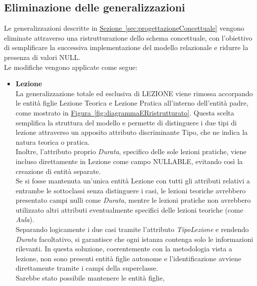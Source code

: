 \documentclass[10pt,twoside]{article}
\begin{document}
{    \subsection{Eliminazione delle generalizzazioni}{
        Le generalizzazioni descritte in \hyperref[sec:progettazioneConcettuale]{Sezione~\ref*{sec:progettazioneConcettuale}} vengono 
        eliminate attraverso una ristrutturazione dello schema concettuale, 
        con l’obiettivo di semplificare la successiva implementazione del modello relazionale 
        e ridurre la presenza di valori NULL. \\
        Le modifiche vengono applicate come segue:
        \begin{itemize}
            \item \textbf{Lezione} \\ La generalizzazione totale ed esclusiva di LEZIONE viene rimossa 
            accorpando le entità figlie Lezione Teorica e Lezione Pratica all'interno dell'entità 
            padre, come mostrato in \hyperref[fig:diagrammaERristrutturato]{Figura~\ref*{fig:diagrammaERristrutturato}}.
            Questa scelta semplifica la struttura del modello 
            e permette di distinguere i due tipi di lezione attraverso un apposito attributo 
            discriminante Tipo, che ne indica la natura teorica o pratica. \\
            Inoltre, l’attributo proprio \textit{Durata}, specifico delle sole lezioni pratiche, 
            viene incluso direttamente in 
            Lezione come campo NULLABLE, evitando così la creazione di entità separate. \\
            Se si fosse mantenuta un’unica entità Lezione con tutti gli attributi relativi a 
            entrambe le sottoclassi senza distinguere i casi, le lezioni teoriche avrebbero 
            presentato campi nulli come \textit{Durata}, mentre le lezioni pratiche non avrebbero 
            utilizzato altri attributi eventualmente specifici delle lezioni teoriche (come \textit{Aula}). \\
            Separando logicamente i due casi tramite l’attributo \textit{TipoLezione} e rendendo \textit{Durata} 
            facoltativo, si garantisce che ogni istanza contenga solo le informazioni rilevanti.
            In questa soluzione, coerentemente con la metodologia vista a lezione, 
            non sono presenti entità figlie autonome e l’identificazione avviene direttamente 
            tramite i campi della superclasse. \\
            Sarebbe stato possibile mantenere le entità figlie,

\end{itemize}}}
\end{document}
